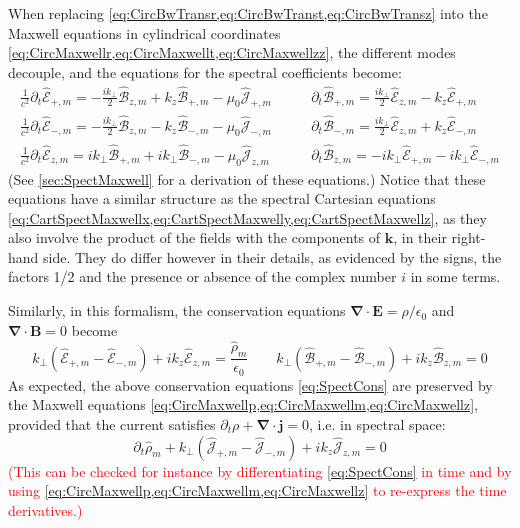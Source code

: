 \documentclass[1p,times]{elsarticle}
\renewcommand{\vec}[1]{\boldsymbol{#1}}
\newcommand{\comment}[1]{\textcolor{red}{#1}}
\newcommand{\spectral}[1]{\hat{\mathcal{#1}}}
\begin{document}
When replacing \cref{eq:CircBwTransr,eq:CircBwTranst,eq:CircBwTransz} into the Maxwell equations in cylindrical
coordinates \cref{eq:CircMaxwellr,eq:CircMaxwellt,eq:CircMaxwellzz},
the different modes decouple, and the equations for the spectral
coefficients become:
\begin{subequations}
\begin{align}
\frac{1}{c^2}\partial_t \spectral{E}_{+,m} = - \frac{ik_\perp }{2}\spectral{B}_{z,m} + k_z\spectral{B}_{+,m} - \mu_0\spectral{J}_{+,m} \qquad &   
\partial_t \spectral{B}_{+,m} = \frac{ik_\perp }{2} \spectral{E}_{z,m} - k_z
\spectral{E}_{+,m} 
\label{eq:CircMaxwellp} \\
\frac{1}{c^2}\partial_t \spectral{E}_{-,m} = -\frac{ik_\perp }{2} \spectral{B}_{z,m} - k_z \spectral{B}_{-,m} - \mu_0  \spectral{J}_{-,m} \qquad &   
\partial_t \spectral{B}_{-,m} = \frac{ik_\perp }{2} \spectral{E}_{z,m} + k_z
\spectral{E}_{-,m} \label{eq:CircMaxwellm} \\
\frac{1}{c^2}\partial_t \spectral{E}_{z,m} = ik_\perp  \spectral{B}_{+,m} + ik_\perp \spectral{B}_{-,m}  - \mu_0 \spectral{J}_{z,m}  \qquad & 
\partial_t \spectral{B}_{z,m} = -ik_\perp  \spectral{E}_{+,m} - ik_\perp \spectral{E}_{-,m}  \label{eq:CircMaxwellz} 
\end{align}
\end{subequations}
(See \ref{sec:SpectMaxwell} for a derivation of these equations.)
Notice that these equations have a similar structure as the spectral
Cartesian equations \cref{eq:CartSpectMaxwellx,eq:CartSpectMaxwelly,eq:CartSpectMaxwellz}, as 
they also involve the product of the fields with the components of
$\vec{k}$, in their right-hand side. They do differ however in their
details, as evidenced by the signs, the factors 1/2 and the
presence or absence of the complex number $i$ in some terms.

Similarly, in this formalism, the conservation equations
$\vec{\nabla}\cdot\vec{E}=\rho/\epsilon_0$ and
$\vec{\nabla}\cdot\vec{B} = 0$
become
\begin{equation}
\label{eq:SpectCons}
k_\perp (\spectral{E}_{+,m} -\spectral{E}_{-,m}) + ik_z \spectral{E}_{z,m} =
\frac{\spectral{\rho}_m}{\epsilon_0} \qquad
 k_\perp (\spectral{B}_{+,m} -\spectral{B}_{-,m}) + ik_z \spectral{B}_{z,m} =
0 \end{equation}
As expected, the above conservation equations \cref{eq:SpectCons} are
preserved by the Maxwell equations
\cref{eq:CircMaxwellp,eq:CircMaxwellm,eq:CircMaxwellz}, provided
that the current satisfies $\partial_t
\rho + \vec{\nabla} \cdot \vec{j} = 0$, i.e. in spectral space:
\begin{equation}
\label{eq:SpectCharge}
\partial_t \spectral{\rho}_m + k_\perp (\spectral{J}_{+,m} -\spectral{J}_{-,m}) + ik_z
\spectral{J}_{z,m} = 0
\end{equation} 
\comment{\noindent (This can be checked for instance by differentiating
\cref{eq:SpectCons} in time and by using
\cref{eq:CircMaxwellp,eq:CircMaxwellm,eq:CircMaxwellz} to re-express the
time derivatives.)}
\end{document}
